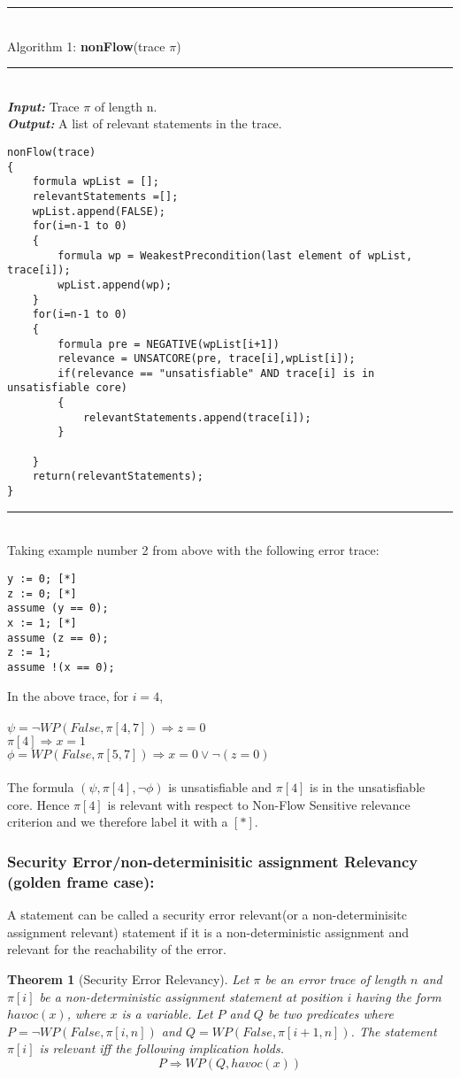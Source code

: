 \documentclass{article}
\newtheorem{theorem}{Theorem}
\begin{document}
\newpage
\rule{\textwidth}{1pt}\\
Algorithm 1: \textbf{nonFlow}(trace $\pi$)\\
\noindent\rule{12cm}{0.4pt}\\
\textbf{\textit{Input:}} Trace $\pi$ of length n.\\
\textbf{\textit{Output:}} A list of relevant statements in the trace.
\begin{lstlisting}
nonFlow(trace)
{
	formula wpList = [];
	relevantStatements =[];
	wpList.append(FALSE);
	for(i=n-1 to 0)
	{
		formula wp = WeakestPrecondition(last element of wpList, trace[i]);
		wpList.append(wp);
	}
	for(i=n-1 to 0)
	{
		formula pre = NEGATIVE(wpList[i+1])
		relevance = UNSATCORE(pre, trace[i],wpList[i]);
		if(relevance == "unsatisfiable" AND trace[i] is in unsatisfiable core)
		{
			relevantStatements.append(trace[i]);
		}
		
	}
	return(relevantStatements);
}
\end{lstlisting}
\rule{\textwidth}{1pt}\\
Taking example number 2 from above with the following error trace:

\begin{lstlisting}
y := 0; [*]
z := 0; [*]
assume (y == 0);
x := 1; [*]
assume (z == 0);
z := 1;
assume !(x == 0);
\end{lstlisting}
In the above trace, for $i=4$,\\
\\
$\psi = \neg WP(False, \pi[4,7]) \Longrightarrow z=0$\\
$\pi[4] \Longrightarrow x=1$\\
$\phi =  WP(False, \pi[5,7]) \Longrightarrow x=0 \vee \neg(z=0)$\\
\\
The formula $(\psi,\pi[4],\neg \phi)$ is unsatisfiable and $\pi[4]$ is in the unsatisfiable core. Hence $\pi[4]$ is relevant with respect to Non-Flow Sensitive relevance criterion and we therefore label it with a $[*]$.
\subsubsection{Security Error/non-determinisitic assignment Relevancy (golden frame case):}
A statement can be called a security error relevant(or a non-determinisitc assignment relevant) statement if it is a non-deterministic assignment and relevant for the reachability of the error.
\begin{theorem}[Security Error Relevancy] 
Let $\pi$ be an error trace of length $n$ and $\pi[i]$ be a non-deterministic assignment statement at position $i$ having the form $havoc(x)$, where $x$ is a variable. Let $P$ and $Q$ be two predicates where $P = \neg WP(False, \pi[i,n])$ and $Q =  WP(False, \pi[i+1,n])$. The statement $\pi[i]$ is relevant iff the following implication holds.
 $$P \Rightarrow WP(Q,havoc(x))$$
\end{theorem}
\end{document}
